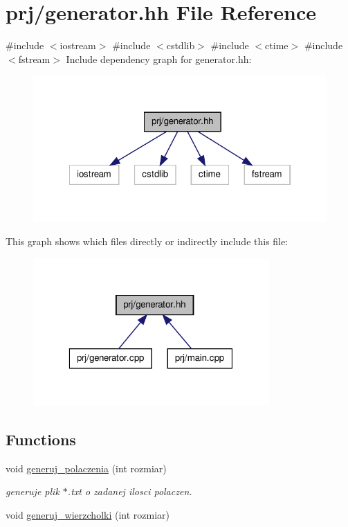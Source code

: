\hypertarget{generator_8hh}{\section{prj/generator.hh \-File \-Reference}
\label{generator_8hh}
}
{\ttfamily \#include $<$iostream$>$}\*
{\ttfamily \#include $<$cstdlib$>$}\*
{\ttfamily \#include $<$ctime$>$}\*
{\ttfamily \#include $<$fstream$>$}\*
\-Include dependency graph for generator.\-hh\-:\nopagebreak
\begin{figure}[H]
\begin{center}
\leavevmode
\includegraphics[width=322pt]{generator_8hh__incl}
\end{center}
\end{figure}
\-This graph shows which files directly or indirectly include this file\-:\nopagebreak
\begin{figure}[H]
\begin{center}
\leavevmode
\includegraphics[width=256pt]{generator_8hh__dep__incl}
\end{center}
\end{figure}
\subsection*{\-Functions}
\begin{DoxyCompactItemize}
\item 
void \hyperlink{generator_8hh_a242a9701c409c59f651874736f8cef01}{generuj\-\_\-polaczenia} (int rozmiar)
\begin{DoxyCompactList}\small\item\em generuje plik $\ast$.txt o zadanej ilosci polaczen. \end{DoxyCompactList}\item 
void \hyperlink{generator_8hh_ae448f3fbbbd7702dc3faea2a133947d8}{generuj\-\_\-wierzcholki} (int rozmiar)
\end{DoxyCompactItemize}


